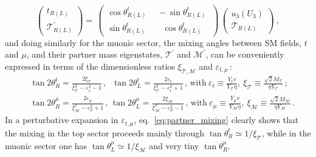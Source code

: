 \begin{equation}
	\label{eq:rot_phys_states} 
	\left(  \begin{array}{c}
		t_{R (L)} \\  \mathcal{T}^{\prime}_{R (L)}
	\end{array} \right) = \,
	\begin{pmatrix}
		\cos \theta^{t}_{R(L)} \ & \ - \sin \theta^{t}_{R(L)} \ \\
		\sin \theta^{t}_{R(L)}  \ & \ \ \ \, \cos \theta^{t}_{R(L)}
	\end{pmatrix} \,
	\left(  \begin{array}{c}
		u_{3} (U_{3}) \\  
		\mathcal{T}_{R (L)}
	\end{array} \right) \ ,
\end{equation}
and doing similarly for the muonic sector, the mixing angles between SM fields, $t$ and $\mu$,  and their partner mass eigenstates, $\mathcal{T}^{\prime}$ and $\mathcal{M}^{\prime}$, can be conveniently expressed in terms of the dimensionless ratios $\xi_{\mathcal{T,M}}$ and $\varepsilon_{t,\mu}\, $:
\begin{eqnarray}
	\label{eq:partner_mixing}
	& \  \tan 2 \theta_{R}^{t} = \frac{2 \xi_{\mathcal{T}}}{\xi_{\mathcal{T}}^2-\varepsilon_{t}^2-1} \, , \, 
	\ \, \tan 2 \theta_{L}^{t} = \frac{2 \varepsilon_{t}}{\xi_{\mathcal{T}}^2-\varepsilon_{t}^2 +1} \, , \,   \textrm{with} \ \varepsilon_{t} \equiv \frac{Y_{t} v}{Y_{\mathcal{T}} \eta},~\xi_{\mathcal{T}} \equiv \frac{\sqrt{2} M_{\mathcal{T}}}{\eta Y_{\mathcal{T}}} \, ; \ \\
	& \  \tan 2 \theta_{R}^{\mu} = \frac{2 \varepsilon_{\mu}}{\xi_{\mathcal{M}}^2-\varepsilon_{\mu}^2+1} \, , \, 
	\tan 2 \theta_{L}^{\mu} = \frac{2 \xi_{\mathcal{M}}}
	{\xi_{\mathcal{M}}^2-\varepsilon_{\mu}^2 -1}  \, , \, 
	\textrm{with} \ \varepsilon_{\mu} \equiv \frac{Y_{\mu} v}{Y_{\mathcal{M}} \eta},~\xi_{\mathcal{M}} \equiv \frac{\sqrt{2} M_{\mathcal{M}}}{\eta Y_{\mathcal{M}}} \, .
	\nonumber
\end{eqnarray}
In a perturbative expansion in $\varepsilon_{t,\mu}$, eq.~\eqref{eq:partner_mixing} clearly shows that the mixing in the top sector proceeds mainly through $\tan\theta^{t}_{R} \simeq 1/\xi_{\mathcal{T}}$, while in the muonic sector one has  $\tan\theta^{\mu}_{L} \simeq 1/\xi_{\mathcal{M}}$ and very tiny $\tan\theta^{\mu}_{R}$.

